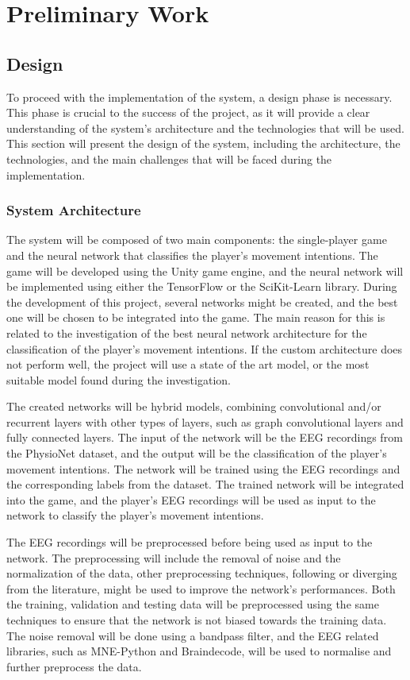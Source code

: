 \chapter{Preliminary Work}\label{ch:preliminary_work}
\section{Design}\label{sec:design}
To proceed with the implementation of the system, a design phase is necessary. 
This phase is crucial to the success of the project, as it will provide a clear understanding of the system's architecture and the technologies that will be used. 
This section will present the design of the system, including the architecture, the technologies, and the main challenges that will be faced during the implementation.

\subsection{System Architecture}
The system will be composed of two main components: the single-player game and the neural network that classifies the player's movement intentions.
The game will be developed using the Unity game engine, and the neural network will be implemented using either the TensorFlow or the SciKit-Learn library.
During the development of this project, several networks might be created, and the best one will be chosen to be integrated into the game.
The main reason for this is related to the investigation of the best neural network architecture for the classification of the player's movement intentions.
If the custom architecture does not perform well, the project will use a state of the art model, or the most suitable model found during the investigation.

The created networks will be hybrid models, combining convolutional and/or recurrent layers with other types of layers, such as graph convolutional layers and fully connected layers.
The input of the network will be the EEG recordings from the PhysioNet dataset, and the output will be the classification of the player's movement intentions.
The network will be trained using the EEG recordings and the corresponding labels from the dataset.
The trained network will be integrated into the game, and the player's EEG recordings will be used as input to the network to classify the player's movement intentions.

The EEG recordings will be preprocessed before being used as input to the network.
The preprocessing will include the removal of noise and the normalization of the data, other preprocessing techniques, following or diverging from the literature, might be used to improve the network's performances.
Both the training, validation and testing data will be preprocessed using the same techniques to ensure that the network is not biased towards the training data.
The noise removal will be done using a bandpass filter, and the EEG related libraries, such as MNE-Python and Braindecode, will be used to normalise and further preprocess the data.

